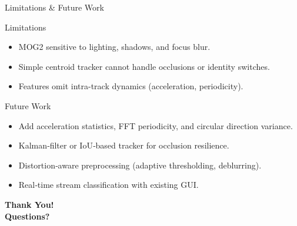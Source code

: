 \documentclass[compress,aspectratio=169]{beamer}
\newcommand{\standout}[1]{\begin{center}\LARGE\bfseries #1\end{center}}
\begin{document}
\begin{frame}{Limitations \& Future Work}
  \begin{block}{Limitations}
    \begin{itemize}
      \item MOG2 sensitive to lighting, shadows, and focus blur.
      \item Simple centroid tracker cannot handle occlusions or identity switches.
      \item Features omit intra-track dynamics (acceleration, periodicity).
    \end{itemize}
  \end{block}
  \vspace{0.2cm}
  \begin{exampleblock}{Future Work}
    \begin{itemize}
      \item Add acceleration statistics, FFT periodicity, and circular direction variance.
      \item Kalman‑filter or IoU‑based tracker for occlusion resilience.
      \item Distortion‑aware preprocessing (adaptive thresholding, deblurring).
      \item Real‑time stream classification with existing GUI.
    \end{itemize}
  \end{exampleblock}
\end{frame}

\standout{\LARGE Thank You!\\\vspace{0.5cm}\Large Questions?}
\end{document}
